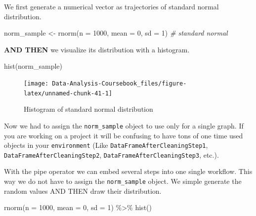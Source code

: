 \documentclass[
]{article}
\newenvironment{Shaded}{\begin{snugshade}}{\end{snugshade}}
\newcommand{\AttributeTok}[1]{\textcolor[rgb]{0.77,0.63,0.00}{#1}}
\newcommand{\CommentTok}[1]{\textcolor[rgb]{0.56,0.35,0.01}{\textit{#1}}}
\newcommand{\DecValTok}[1]{\textcolor[rgb]{0.00,0.00,0.81}{#1}}
\newcommand{\FunctionTok}[1]{\textcolor[rgb]{0.00,0.00,0.00}{#1}}
\newcommand{\NormalTok}[1]{#1}
\newcommand{\OtherTok}[1]{\textcolor[rgb]{0.56,0.35,0.01}{#1}}
\newcommand{\SpecialCharTok}[1]{\textcolor[rgb]{0.00,0.00,0.00}{#1}}
\begin{document}
We first generate a numerical vector as trajectories of standard normal distribution.

\begin{Shaded}
\begin{Highlighting}[]
\NormalTok{norm\_sample }\OtherTok{\textless{}{-}} \FunctionTok{rnorm}\NormalTok{(}\AttributeTok{n =} \DecValTok{1000}\NormalTok{, }\AttributeTok{mean =} \DecValTok{0}\NormalTok{, }\AttributeTok{sd =} \DecValTok{1}\NormalTok{) }\CommentTok{\# standard normal}
\end{Highlighting}
\end{Shaded}

\textbf{AND THEN} we visualize its distribution with a histogram.

\begin{Shaded}
\begin{Highlighting}[]
\FunctionTok{hist}\NormalTok{(norm\_sample)}
\end{Highlighting}
\end{Shaded}

\begin{figure}

{\centering \texttt{[image: Data-Analysis-Coursebook\_files/figure-latex/unnamed-chunk-41-1]} 

}

\caption{Histogram of standard normal distribution}\label{fig:unnamed-chunk-41}
\end{figure}

Now we had to assign the \texttt{norm\_sample} object to use only for a single graph. If you are working on a project it will be confusing to have tons of one time used objects in your \texttt{environment} (Like \texttt{DataFrameAfterCleaningStep1}, \texttt{DataFrameAfterCleaningStep2}, \texttt{DataFrameAfterCleaningStep3}, etc.).

With the pipe operator we can embed several steps into one single workflow. This way we do not have to assign the \texttt{norm\_sample} object. We simple generate the random values AND THEN draw their distribution.

\begin{Shaded}
\begin{Highlighting}[]
\FunctionTok{rnorm}\NormalTok{(}\AttributeTok{n =} \DecValTok{1000}\NormalTok{, }\AttributeTok{mean =} \DecValTok{0}\NormalTok{, }\AttributeTok{sd =} \DecValTok{1}\NormalTok{) }\SpecialCharTok{\%\textgreater{}\%} 
  \FunctionTok{hist}\NormalTok{()}
\end{Highlighting}
\end{Shaded}
\end{document}
